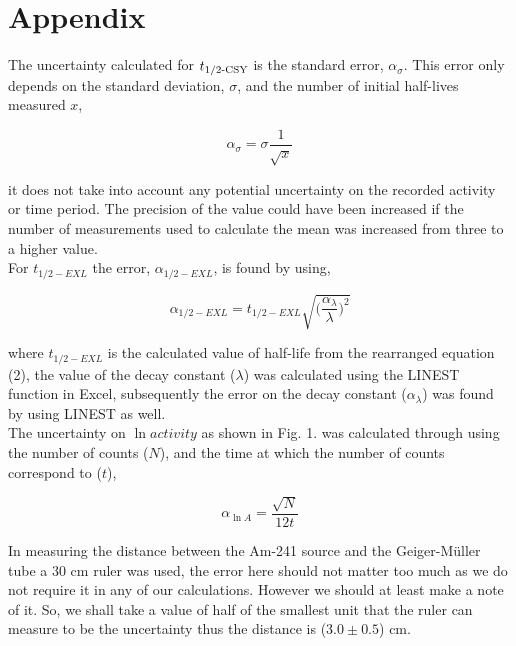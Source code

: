 \documentclass[twocolumn]{revtex4}
\begin{document}
\clearpage

\vspace{-3ex}
\section*{Appendix}
\vspace{-2ex}

The uncertainty calculated for $t\textsubscript{1/2-CSY}$ is the standard error, $\alpha_\sigma$. This error only depends on the standard deviation, $\sigma$, and the number of initial half-lives measured $x$,

\begin{equation} \tag{5}
\alpha_\sigma=\sigma \frac{1}{\sqrt{x}}
\end{equation}

 it does not take into account any potential uncertainty on the recorded activity or time period. The precision of the value could have been increased if the number of measurements used to calculate the mean was increased from three to a higher value.
\\

For $t_{1/2-EXL}$ the error, $\alpha_{1/2-EXL}$, is found by using,

\begin{equation} \tag{6}
\alpha_{1/2-EXL}=t_{1/2-EXL}\sqrt{\Big(\frac{\alpha_\lambda}{\lambda}\Big)^2} 
\end{equation}

where $t_{1/2-EXL}$ is the calculated value of half-life from the rearranged equation (2), the value of the decay constant ($\lambda$) was calculated using the LINEST function in Excel, subsequently the error on the decay constant ($\alpha_{\lambda}$) was found by using LINEST as well. 
\\

The uncertainty on $\ln{activity}$ as shown in Fig. 1. was calculated through using the number of counts ($N$), and the time at which the number of counts correspond to ($t$),

\begin{equation} \tag{7}
\alpha_{\ln{A}}=\frac{\sqrt{N}}{12t}
\end{equation}

In measuring the distance between the Am-241 source and the Geiger-M\"{u}ller tube a 30 cm ruler was used, the error here should not matter too much as we do not require it in any of our calculations. However we should at least make a note of it. So, we shall take a value of half of the smallest unit that the ruler can measure to be the uncertainty thus the distance is ($3.0\pm0.5$) cm.
\end{document}
